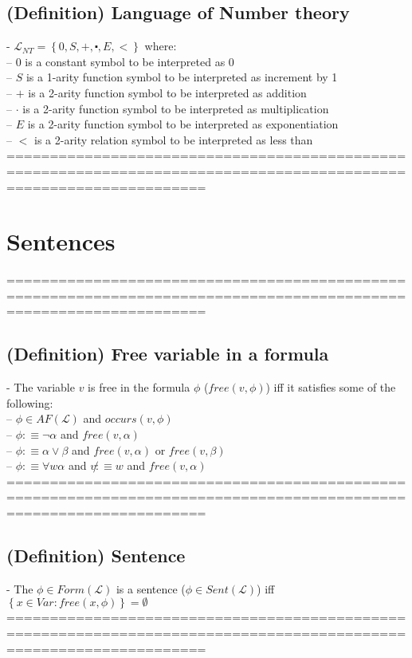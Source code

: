 \documentclass{book}
\newcommand{\is}{:\equiv}
\newcommand{\inot}{\not}
\newcommand{\occurs}[2]{occurs(#1, #2)}
\newcommand{\free}[2]{free(#1, #2)}
\newcommand{\set}[1]{\left\{ #1 \right\}}
\begin{document}
\subsection{(Definition) Language of Number theory} %
	- $\mathcal{L}_{NT} = \set{0, S, +, \centerdot, E, <}$ where: \\
		-- $0$ is a constant symbol to be interpreted as 0 \\
		-- $S$ is a 1-arity function symbol to be interpreted as increment by 1 \\
		-- $+$ is a 2-arity function symbol to be interpreted as addition \\
		-- $·$ is a 2-arity function symbol to be interpreted as multiplication \\
		-- $E$ is a 2-arity function symbol to be interpreted as exponentiation \\
		-- $<$ is a 2-arity relation symbol to be interpreted as less than \\
	===================================================================================================================

\section{Sentences}
	===================================================================================================================
\subsection{(Definition) Free variable in a formula} %
	- The variable $v$ is free in the formula $\phi$ ($\free{v}{\phi}$) iff it satisfies some of the following: \\
		-- $\phi \in AF(\mathcal{L})$ and $\occurs{v}{\phi}$ \\
		-- $\phi \is \lnot \alpha$ and $\free{v}{\alpha}$ \\
		-- $\phi \is \alpha \lor \beta$ and $\free{v}{\alpha}$ or $\free{v}{\beta}$ \\
		-- $\phi \is \forall w \alpha$ and $v \inot \is w$ and $\free{v}{\alpha}$ \\
	===================================================================================================================
\subsection{(Definition) Sentence} %
	- The $\phi \in Form(\mathcal{L})$ is a sentence ($\phi \in Sent(\mathcal{L})$) iff $\set{x \in Var: \free{x}{\phi}} = \emptyset$ \\
	===================================================================================================================
\end{document}

